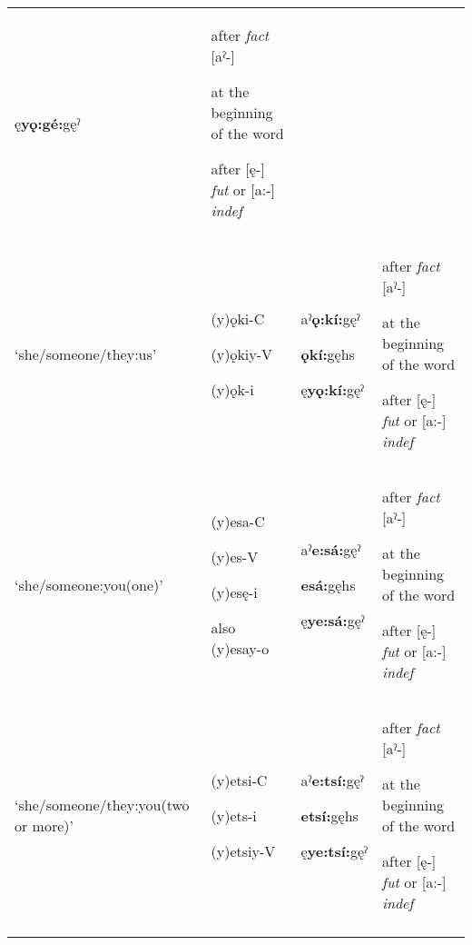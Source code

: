 \begin{table}
{\begin{tabularx}{\textwidth}{XXXX}
ę\textbf{yǫ:gé:}gęˀ & after \textit{fact} [aˀ-] 

at the beginning of the word 

after [ę-] \textit{fut} or [a:-] \textit{indef}\\
‘she/someone/they:us’ & (y)ǫki-C

(y)ǫkiy-V

(y)ǫk-i & aˀ\textbf{ǫ:kí:}gęˀ

\textbf{ǫkí:}gęhs

ę\textbf{yǫ:kí:}gęˀ & after \textit{fact} [aˀ-] 

at the beginning of the word 

after [ę-] \textit{fut} or [a:-] \textit{indef}\\
‘she/someone:you(one)’ & (y)esa-C

(y)es-V

(y)esę-i

also (y)esay-o & aˀ\textbf{e:sá:}gęˀ

\textbf{esá:}gęhs

ę\textbf{ye:sá:}gęˀ & after \textit{fact} [aˀ-] 

at the beginning of the word 

after [ę-] \textit{fut} or [a:-] \textit{indef}\\
‘she/someone/they:you(two or more)’ & (y)etsi-C

(y)ets-i

(y)etsiy-V & aˀ\textbf{e:tsí:}gęˀ

\textbf{etsí:}gęhs

ę\textbf{ye:tsí:}gęˀ & after \textit{fact} [aˀ-] 

at the beginning of the word 

after [ę-] \textit{fut} or [a:-] \textit{indef}\\
\lspbottomrule
\end{tabularx}}
\end{table}


